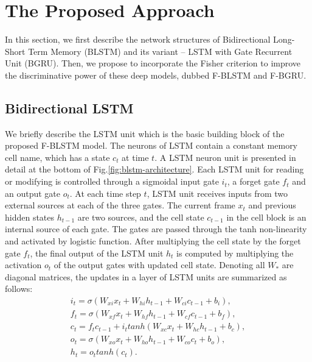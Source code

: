 \documentclass[review]{elsarticle}
\begin{document}
\section{The Proposed Approach}\label{sec:approach}
In this section, we first describe the network structures of {Bidirectional Long-Short Term Memory (BLSTM) and its variant -- LSTM with Gate Recurrent Unit (BGRU).} Then, we propose to incorporate the Fisher criterion to improve the discriminative power of these deep models, dubbed F-BLSTM and F-BGRU.

\subsection{Bidirectional LSTM}\label{sec:blstm}
We briefly describe the LSTM unit which is the basic building block of the proposed F-BLSTM model. The neurons of LSTM contain a constant memory cell name, which has a state $c_t$ at time $t$. {A LSTM neuron unit is presented in detail at the bottom of Fig.\;\ref{fig:blstm-architecture}}. Each LSTM unit for reading or modifying is controlled through a sigmoidal input gate $i_t$, a forget gate $f_t$ and an output gate $o_t$. At each time step $t$, {LSTM unit receives inputs from two external sources at each of the three gates.} The current frame $x_t$ and previous hidden states $h_{t-1}$ are two sources, and the cell state $c_{t-1}$ in the cell block is an internal source of each gate. The gates are passed through the tanh non-linearity and activated by logistic function. After multiplying the cell state by the forget gate $f_t$, the final output of the LSTM unit $h_t$ is computed by multiplying the activation $o_t$ of the output gates with updated cell state. Denoting all $W_*$ are diagonal matrices, the updates in a layer of LSTM units are summarized as follows:
\begin{equation}
	\begin{array}{l}
	{i_t} = \sigma \left( {{W_{xi}}{x_t} + {W_{hi}}{h_{t - 1}} + {W_{ci}}{c_{t - 1}} + {b_i}} \right),\\
	{f_t} = \sigma \left( {{W_{xf}}{x_t} + {W_{hf}}{h_{t - 1}} + {W_{cf}}{c_{t - 1}} + {b_f}} \right),\\
	{c_t}={f_t}c_{t-1}+{i_t}tanh\left(W_{xc}x_t+W_{hc}h_{t-1}+b_c\right),\\
	o_t=\sigma\left(W_{xo}x_t+W_{ho}h_{t-1}+W_{co}c_t+b_o\right),\\
	h_t={o_t}tanh\left(c_t\right).
	\end{array}
	\label{eq:lstm-unit}
\end{equation}
\end{document}

